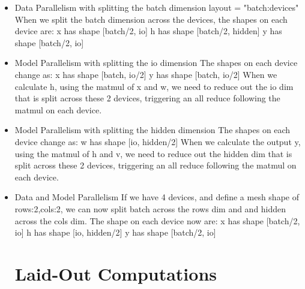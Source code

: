 \documentclass{article}
\def \O {\varnothing}
\begin{document}
\begin{itemize}
\item Data Parallelism with splitting the batch dimension
layout =  "batch:devices"
When we split the batch dimension across the devices, the shapes on each device are:
x has shape [batch/2, io]
h has shape [batch/2, hidden]
y has shape [batch/2, io]

\item Model Parallelism with splitting the io dimension
The shapes on each device change as:
x has shape [batch, io/2]
y has shape [batch, io/2]
When we calculate h, using the matmul of x and w, we need to reduce out the io dim that is split across these 2 devices, triggering an all reduce following the matmul on each device.

\item Model Parallelism with splitting the hidden dimension
The shapes on each device change as:
w has shape [io, hidden/2]
When we calculate the output y, using the matmul of h and v, we need to reduce out the hidden dim that is split across these 2 devices, triggering an all reduce following the matmul on each device.

\item Data and Model Parallelism
If we have 4 devices, and define a mesh shape of {rows:2,cols:2}, we can now split batch across the rows dim and and hidden across the cols dim.
The shape on each device now are:
x has shape [batch/2, io]
h has shape [io, hidden/2]
y has shape [batch/2, io]

\fi






















\iffalse

\section{Laid-Out Computations}

\def \B {b}
\def \DX {d_x}
\def \DY {d_y}
\def \DH {d_h}

\def \ZN {{\langle 0, \O \rangle}}
\def \NN {{\langle \O, \O \rangle}}


\def \Xshape {{{[\B, \DX]}}}
\def \Hshape {{{[\B, \DH]}}}
\def \Yshape {{{[\B, \DY]}}}
\def \Woneshape {{{[\DX, \DH]}}}
\def \Hshape {{{[\B, \DH]}}}
\def \Wtwoshape {{{[\DH, \DY]}}}
\def \XTshape {{{[\DX, b]}}}
\def \HTshape {{{[\DH, b]}}}
\def \YTshape {{{[\DY, b]}}}
\def \WoneTshape {{[\DH, \DX]}}
\def \WtwoTshape {{[\DY, \DH]}}
\def \OO {{{\{1\rightarrow1\}}}}
\def \OZ {{{\{1\rightarrow0\}}}}
\def \ZO{{{\{0\rightarrow1\}}}}
\def \ZNOO {{{\{0\rightarrow0,1\rightarrow1\}}}}
\def \BZ {{{\{b \rightarrow 0\}}}}
\def \HZ {{{\{d_h \rightarrow 0\}}}}
\def \BZHO {\{b \rightarrow 0, d_h \rightarrow 1\}}


\end{itemize}
\end{document}
